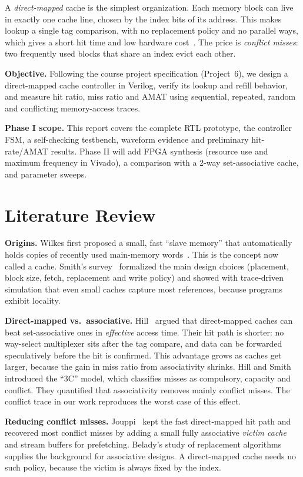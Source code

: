 \documentclass[conference]{IEEEtran}
\begin{document}
A \emph{direct-mapped} cache is the simplest organization. Each memory block can live in exactly one cache line, chosen by the index bits of its address. This makes lookup a single tag comparison, with no replacement policy and no parallel ways, which gives a short hit time and low hardware cost~\cite{hill1988}. The price is \emph{conflict misses}: two frequently used blocks that share an index evict each other.

\textbf{Objective.} Following the course project specification (Project~6), we design a direct-mapped cache controller in Verilog, verify its lookup and refill behavior, and measure hit ratio, miss ratio and AMAT using sequential, repeated, random and conflicting memory-access traces.

\textbf{Phase I scope.} This report covers the complete RTL prototype, the controller FSM, a self-checking testbench, waveform evidence and preliminary hit-rate/AMAT results. Phase II will add FPGA synthesis (resource use and maximum frequency in Vivado), a comparison with a 2-way set-associative cache, and parameter sweeps.

\section{Literature Review}
\textbf{Origins.} Wilkes first proposed a small, fast ``slave memory'' that automatically holds copies of recently used main-memory words~\cite{wilkes1965}. This is the concept now called a cache. Smith's survey~\cite{smith1982} formalized the main design choices (placement, block size, fetch, replacement and write policy) and showed with trace-driven simulation that even small caches capture most references, because programs exhibit locality.

\textbf{Direct-mapped vs.\ associative.} Hill~\cite{hill1988} argued that direct-mapped caches can beat set-associative ones in \emph{effective} access time. Their hit path is shorter: no way-select multiplexer sits after the tag compare, and data can be forwarded speculatively before the hit is confirmed. This advantage grows as caches get larger, because the gain in miss ratio from associativity shrinks. Hill and Smith~\cite{hill1989} introduced the ``3C'' model, which classifies misses as compulsory, capacity and conflict. They quantified that associativity removes mainly conflict misses. The conflict trace in our work reproduces the worst case of this effect.

\textbf{Reducing conflict misses.} Jouppi~\cite{jouppi1990} kept the fast direct-mapped hit path and recovered most conflict misses by adding a small fully associative \emph{victim cache} and stream buffers for prefetching. Belady's study of replacement algorithms~\cite{belady1966} supplies the background for associative designs. A direct-mapped cache needs no such policy, because the victim is always fixed by the index.
\end{document}
